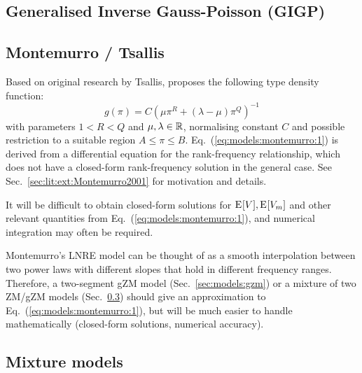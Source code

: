 \documentclass[a4paper]{article}
\begin{document}
\subsection{Generalised Inverse Gauss-Poisson (GIGP)}
\label{sec:models:gigp}

\subsection{Montemurro / Tsallis}
\label{sec:models:montemurro}

Based on original research by Tsallis,  \citet{Montemurro:01} proposes the following type density function:
\begin{equation}
  \label{eq:models:montemurro:1}
  g(\pi) = C \left( \mu \pi^R + (\lambda - \mu) \pi^Q  \right)^{-1}
\end{equation}
with parameters $1 < R < Q$ and $\mu, \lambda\in \mathbb{R}$, normalising constant $C$ and possible restriction to a suitable region $A\leq \pi\leq B$.  Eq.~(\ref{eq:models:montemurro:1}) is derived from a differential equation for the rank-frequency relationship, which does not have a closed-form rank-frequency solution in the general case.  See Sec.~\ref{sec:lit:ext:Montemurro2001} for motivation and details.

It will be difficult to obtain closed-form solutions for $\mathrm{E}_{}[V], \mathrm{E}_{}[V_m]$ and other relevant quantities from Eq.~(\ref{eq:models:montemurro:1}), and numerical integration may often be required.

Montemurro's LNRE model can be thought of as a smooth interpolation between two power laws with different slopes that hold in different frequency ranges.  Therefore, a two-segment gZM model (Sec.~\ref{sec:models:gzm}) or a mixture of two ZM/gZM models (Sec.~\ref{sec:models:mixtures}) should give an approximation to Eq.~(\ref{eq:models:montemurro:1}), but will be much easier to handle mathematically (closed-form solutions, numerical accuracy).


\subsection{Mixture models}
\label{sec:models:mixtures}

\end{document}

